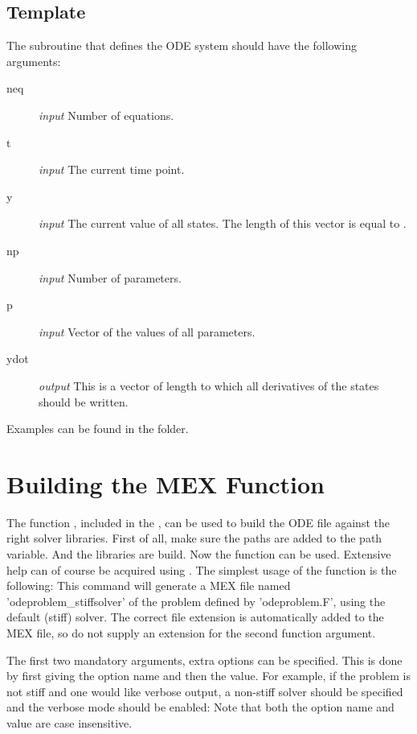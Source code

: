 \subsection{Template}
The \Fortran subroutine that defines the ODE system should have the following arguments:
\begin{description}
 \item[neq] \emph{input} Number of equations.
 \item[t] \emph{input} The current time point.
 \item[y] \emph{input} The current value of all states. The length of this vector is equal to .
 \item[np] \emph{input} Number of parameters.
 \item[p] \emph{input} Vector of the values of all parameters.
 \item[ydot] \emph{output} This is a vector of length  to which all derivatives of the states should be written.
\end{description}



Examples can be found in the  folder.

\section[Building]{Building the MEX Function}
The \MATLAB function , included in the \PPODESUITE, can be used to build the ODE \Fortran file against the right solver libraries. First of all, make sure the \PPODESUITE paths are added to the \MATLAB path variable.
And the libraries are build.
Now the function  can be used. Extensive help can of course be acquired using . The simplest usage of the function is the following:
This command will generate a MEX file named 'odeproblem\_stiffsolver' of the problem defined by 'odeproblem.F', using the default (stiff) solver. The correct file extension is automatically added to the MEX file, so do not supply an extension for the second function argument.

The first two mandatory arguments, extra options can be specified. This is done by first giving the option name and then the value. For example, if the problem is not stiff and one would like verbose output, a non-stiff solver should be specified and the verbose mode should be enabled:
Note that both the option name and value are case insensitive.

